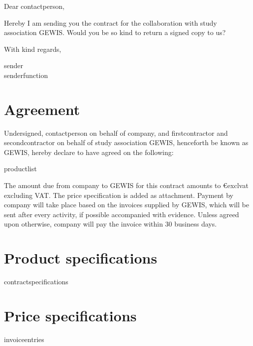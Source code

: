 \documentclass[
printaddress,
]{GEWISLetter}
\begin{document}
	Dear {{{contactperson}}},
	
	Hereby I am sending you the contract for the collaboration with study association GEWIS. Would you be so kind to return a signed copy to us?
	
	With kind regards,	
	
	{{sender}}\\
	{{senderfunction}}
	
	
	\newpage
	\section{Agreement}
	Undersigned, {{contactperson}} on behalf of {{company}}, and {{firstcontractor}} and {{secondcontractor}} on behalf of study association GEWIS, henceforth be known as GEWIS, hereby declare to have agreed on the following:
	\begin{products}
		{{productlist}}
	\end{products}
	
	The amount due from {{company}} to GEWIS for this contract amounts to \euro{{{exclvat}}} excluding VAT. The price specification is added as attachment. Payment by {{company}} will take place based on the invoices supplied by GEWIS, which will be sent after every activity, if possible accompanied with evidence. Unless agreed upon otherwise, {{company}} will pay the invoice within 30 business days.
	\vspace{2em}
	
	\signature{{{firstcontractor}}\\{{firstcontractorfunction}}}
	\hfill
	\signature{{{contactperson}}\\{{company}}}

	\signature{{{secondcontractor}}\\{{secondcontractorfunction}}}


	\newpage
	\appendix
	\section{Product specifications}
	\begin{specifications}
		{{contractspecifications}}
	\end{specifications}
	
	\section{Price specifications}
	\begin{invoice}{}
		{{invoiceentries}}
	\end{invoice}
\end{document}
